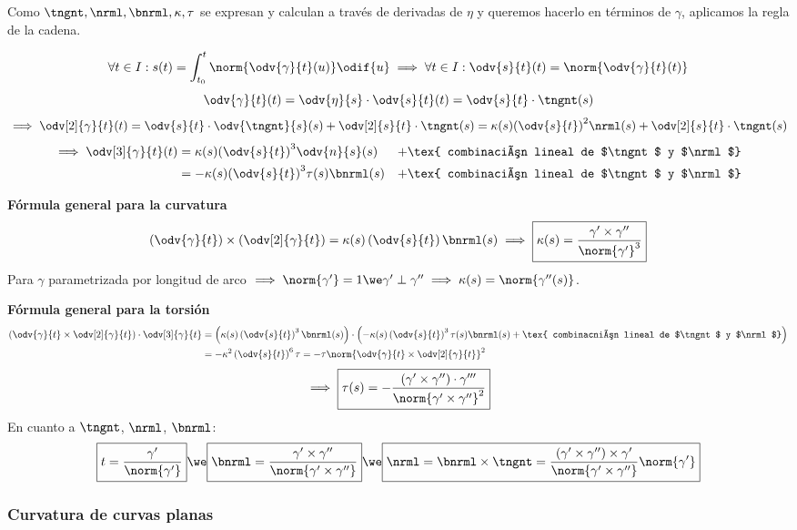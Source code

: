 Como $\tngnt, \nrml, \bnrml, \kappa, \tau$ se expresan y calculan a través de derivadas de $\eta$ y queremos hacerlo en términos de $\gamma$, aplicamos la regla de la cadena.

\[\forall t \in I : s(t) = \int_{t_0}^t \norm{\odv{\gamma}{t}(u)}\odif{u} \implies \forall t \in I : \odv{s}{t}(t)=\norm{\odv{\gamma}{t}(t)}\]
\[\odv{\gamma}{t}(t)=\odv{\eta}{s}\cdot\odv{s}{t}(t)=\odv{s}{t}\cdot\tngnt(s)\]
\[\implies \odv[2]{\gamma}{t} (t) = \odv{s}{t}\cdot\odv{\tngnt}{s}(s) + \odv[2]{s}{t}\cdot\tngnt(s) = \kappa(s) {\left(\odv{s}{t}\right)}^2\nrml(s) + \odv[2]{s}{t}\cdot\tngnt(s)\]
\[\begin{aligned}
	\implies \odv[3]{\gamma}{t}(t) &= \kappa(s){\left(\odv{s}{t}\right)}^3\odv{n}{s}(s) &+ \tex{ combinación lineal de $\tngnt$ y $\nrml$} \\
	&= - \kappa(s){\left(\odv{s}{t}\right)}^3\tau(s)\bnrml(s) &+ \tex{ combinación lineal de $\tngnt$ y $\nrml$}
\end{aligned}\]

\textbf{Fórmula general para la curvatura}
\[\left(\odv{\gamma}{t}\right)\times\left(\odv[2]{\gamma}{t}\right)=\kappa(s)\left(\odv{s}{t}\right)\bnrml(s) \implies \boxed{\kappa(s)=\frac{\gamma'\times \gamma''}{\norm{\gamma'}^3}}\]
Para $\gamma$ parametrizada por longitud de arco $\implies \norm{\gamma'}=1 \we \gamma'\perp\gamma'' \implies \kappa(s)=\norm{\gamma''(s)}$.

\textbf{Fórmula general para la torsión}
\[\begin{aligned}
	\left(\odv{\gamma}{t}\times\odv[2]{\gamma}{t}\right) \cdot \odv[3]{\gamma}{t} &= \left(\kappa(s)\left(\odv{s}{t}\right)^3\bnrml(s)\right)\cdot\left(-\kappa(s)\left(\odv{s}{t}\right)^3\tau(s)\bnrml(s) + \tex{ combinacnión lineal de $\tngnt$ y $\nrml$}\right) \\
	&= - \kappa^2\left(\odv{s}{t}\right)^6\tau=-\tau\norm{\odv{\gamma}{t}\times\odv[2]{\gamma}{t}}^2
\end{aligned}\]
\[\implies \boxed{\tau(s)=-\frac{(\gamma'\times\gamma'')\cdot\gamma'''}{\norm{\gamma'\times\gamma''}^2}}\]
En cuanto a $\tngnt$, $\nrml$, $\bnrml$:
\[\boxed{t=\frac{\gamma'}{\norm{\gamma'}}} \we \boxed{\bnrml=\frac{\gamma'\times\gamma''}{\norm{\gamma'\times\gamma''}}} \we \boxed{\nrml=\bnrml\times\tngnt=\frac{\left(\gamma'\times\gamma''\right)\times\gamma'}{\norm{\gamma'\times\gamma''}}\norm{\gamma'}}\]

\subsubsection{Curvatura de curvas planas}


